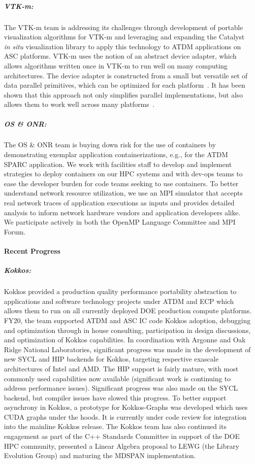 \subparagraph{VTK-m:} The VTK-m team is addressing its challenges through
development of portable visualization algorithms for VTK-m and leveraging and
expanding the Catalyst~\cite{Catalyst}  \emph{in situ} visualization library to
apply this technology to ATDM applications on ASC platforms.  VTK-m uses the
notion of an abstract device adapter, which allows algorithms written once in
VTK-m to run well on many computing architectures.  The device adapter is
constructed from a small but versatile set of data parallel primitives, which
can be optimized for each platform~\cite{Blelloch1990}.  It has been shown that
this approach not only simplifies parallel implementations, but also allows
them to work well across many platforms~\cite{Lo2012,Larsen2015,Moreland2015}.

\subparagraph{OS \& ONR:} The OS \& ONR team is buying down risk for the use of containers by demonstrating exemplar application containerizations, e.g., for the ATDM SPARC application.  We work with facilities staff to develop and implement strategies to deploy containers on our HPC systems and with dev-ops teams to ease the developer burden for code teams seeking to use containers.  To better understand network resource utilization, we use an MPI simulator that accepts real network traces of application executions as inputs and provides detailed analysis to inform network hardware vendors and application developers alike.  We participate actively in both the OpenMP Language Committee and MPI Forum.



\paragraph{Recent Progress}


\subparagraph{Kokkos:}  Kokkos provided a production quality performance portability abstraction to applications and software technology projects under ATDM and ECP which allows them to run on all currently deployed DOE production compute platforms. FY20, the team supported ATDM and ASC IC code Kokkos adoption, debugging and optimization through in house consulting, participation in design discussions, and optimization of Kokkos capabilities.  In coordination with Argonne and Oak Ridge National Laboratories, significant progress was made in the development of new SYCL and HIP backends for Kokkos, targeting respective exascale architectures of Intel and AMD.  The HIP support is fairly mature, with most commonly used capabilities now available (significant work is continuing to address performance issues).  Significant progress was also made on the SYCL backend, but compiler issues have slowed this progress.  To better support asynchrony in Kokkos, a prototype for Kokkos-Graphs was developed which uses CUDA graphs under the hoods. It is currently under code review for integration into the mainline Kokkos release.  The Kokkos team has also continued its engagement as part of the C++ Standards Committee in support of the DOE HPC community, presented a Linear Algebra proposal to LEWG (the Library Evolution Group) and maturing the MDSPAN implementation. 


